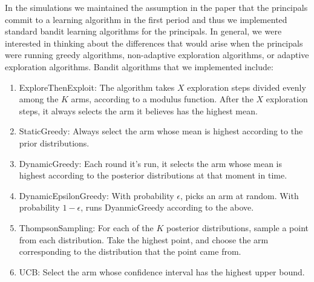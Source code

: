 \documentclass[11pt,letterpaper]{article}
\begin{document}
In the simulations we maintained the assumption in the paper that the principals commit to a learning algorithm in the first period and thus we implemented standard bandit learning algorithms for the principals. In general, we were interested in thinking about the differences that would arise when the principals were running greedy algorithms, non-adaptive exploration algorithms, or adaptive exploration algorithms. Bandit algorithms that we implemented include:
\begin{enumerate}
\item ExploreThenExploit: The algorithm takes $X$ exploration steps divided evenly among the $K$ arms, according to a modulus function. After the $X$ exploration steps, it always selects the arm it believes has the highest mean.
\item StaticGreedy: Always select the arm whose mean is highest according to the prior distributions.
\item DynamicGreedy: Each round it's run, it selects the arm whose mean is highest according to the posterior distributions at that moment in time.
\item DynamicEpsilonGreedy: With probability $\epsilon$, picks an arm at random. With probability $1-\epsilon$, runs DyanmicGreedy according to the above. 
\item ThompsonSampling: For each of the $K$ posterior distributions, sample a point from each distribution. Take the highest point, and choose the arm corresponding to the distribution that the point came from.
\item UCB: Select the arm whose confidence interval has the highest upper bound. 
\end{enumerate}
\end{document}
